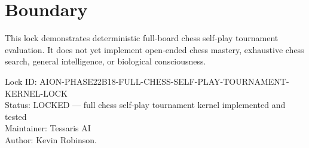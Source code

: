 \documentclass[11pt,a4paper]{article}
\begin{document}
\section{Boundary}

This lock demonstrates deterministic full-board chess self-play tournament evaluation. It does not yet implement open-ended chess mastery, exhaustive chess search, general intelligence, or biological consciousness.

\bigskip

\noindent
Lock ID: AION-PHASE22B18-FULL-CHESS-SELF-PLAY-TOURNAMENT-KERNEL-LOCK\\
Status: LOCKED --- full chess self-play tournament kernel implemented and tested\\
Maintainer: Tessaris AI\\
Author: Kevin Robinson.
\end{document}

